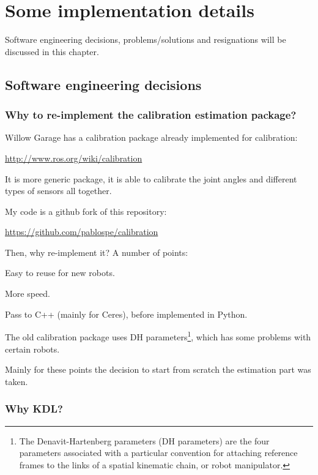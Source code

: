 \chapter{Some implementation details}
\label{cha:implementation}

Software engineering decisions, problems/solutions and resignations will be discussed in this chapter.

\section{Software engineering decisions}

\subsection{Why to re-implement the calibration estimation package?}

Willow Garage has a calibration package already implemented for calibration:

\url{http://www.ros.org/wiki/calibration}

\noindent
It is more generic package, it is able to calibrate the joint angles and different types of sensors all together.


\noindent
My code is a github fork of this repository:

\url{https://github.com/pablospe/calibration}

\noindent
Then, why re-implement it? A number of points: %
\begin{itemize*}
 \item Easy to reuse for new robots.
 \item More speed.
 \item Pass to C++ (mainly for Ceres), before implemented in Python.
 \item The old calibration package uses DH parameters\footnote{The Denavit-Hartenberg parameters (DH parameters) are the four parameters associated with a particular convention for attaching reference frames to the links of a spatial kinematic chain, or robot manipulator.}, which has some problems with certain robots.
\end{itemize*}

Mainly for these points the decision to start from scratch the estimation part was taken.



\subsection{Why KDL?}

